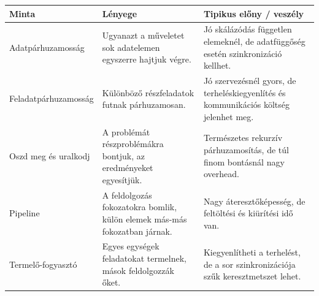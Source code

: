 
\begin{tabularx}{\textwidth}{L{31mm}X X}
\toprule
\textbf{Minta} & \textbf{Lényege} & \textbf{Tipikus előny / veszély} \\
\midrule
Adatpárhuzamosság & Ugyanazt a műveletet sok adatelemen egyszerre hajtjuk végre. & Jó skálázódás független elemeknél, de adatfüggőség esetén szinkronizáció kellhet. \\
Feladatpárhuzamosság & Különböző részfeladatok futnak párhuzamosan. & Jó szervezésnél gyors, de terheléskiegyenlítés és kommunikációs költség jelenhet meg. \\
Oszd meg és uralkodj & A problémát részproblémákra bontjuk, az eredményeket egyesítjük. & Természetes rekurzív párhuzamosítás, de túl finom bontásnál nagy overhead. \\
Pipeline & A feldolgozás fokozatokra bomlik, külön elemek más-más fokozatban járnak. & Nagy áteresztőképesség, de feltöltési és kiürítési idő van. \\
Termelő-fogyasztó & Egyes egységek feladatokat termelnek, mások feldolgozzák őket. & Kiegyenlítheti a terhelést, de a sor szinkronizációja szűk keresztmetszet lehet. \\
\bottomrule
\end{tabularx}
